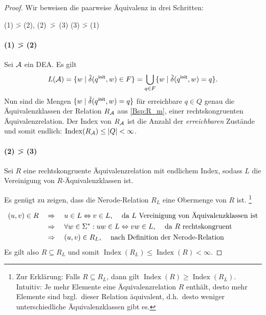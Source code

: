 \begin{proof}
  Wir beweisen die paarweise Äquivalenz in drei Schritten:

  \begin{center}
    (1) \=> (2), \quad \mbox{(2) \=> (3)}\quad {} \quad (3) \=> (1)
  \end{center}

        \paragraph{(1) \=> (2)} Sei $\mathcal{A}$ ein \ac{DEA}. Es gilt
  \begin{displaymath}
    L(\mathcal{A})=\{w \mid \tilde\delta(q^\mathsf{init},w)\in F \} = \bigcup_{q \in F} \{ w \mid \tilde\delta(q^\mathsf{init},w) = q\}.
\end{displaymath}
%
Nun sind die Mengen $\{ w \mid \tilde\delta(q^\mathsf{init},w)=q \}$ für erreichbare $q\in Q$ genau die Äquivalenzklassen der Relation $R_{\mathcal{A}}$ aus \autoref{Bsp:R_m}, einer rechtskongruenten Äquivalenzrelation. 
Der Index von $R_{\mathcal{A}}$ ist die Anzahl der \emph{erreichbaren} Zustände und somit endlich: $\operatorname{\operatorname{Index}}(R_{\mathcal{A}}) \le |Q| < \infty$.
        
\paragraph{(2) \=> (3)} Sei $R$ eine rechtskongruente
Äquivalenzrelation mit endlichem Index, sodass $L$ die Vereinigung von
$R$-Äquivalenzklassen ist. 
        
Es genügt zu zeigen, dass die Nerode-Relation $R_L$ eine Obermenge von $R$ ist.%
\footnote{
Zur Erklärung: Falls $R \subseteq R_L$, dann gilt $\operatorname{Index}(R) \ge \operatorname{Index}(R_L)$.
Intuitiv: Je mehr Elemente eine Äquivalenzrelation $R$ enthält, desto mehr Elemente sind bzgl.\ dieser Relation äquivalent, d.h.\ desto weniger unterschiedliche Äquivalenzklassen gibt es.
}

\begin{align*}
(u, v) \in R & \quad\Rightarrow\quad u \in L \Leftrightarrow v \in L \text{, \quad da $L$ Vereinigung von Äquivalenzklassen ist} \\
& \quad\Rightarrow\quad \forall w \in \Sigma^*: uw \in L \Leftrightarrow vw \in L \text{, \quad da $R$ rechtskongruent } \\
& \quad\Rightarrow\quad (u, v) \in R_L \text{, \quad nach Definition der Nerode-Relation}
\end{align*}
Es gilt also $R \subseteq R_L$ und somit $\operatorname{Index}(R_L) \leq \operatorname{Index}(R)<\infty$.



\end{proof}
